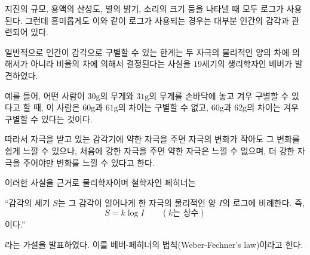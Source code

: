 \documentclass[11pt, a4paper]{book}
\begin{document}
지진의 규모, 용액의 산성도, 별의 밝기, 소리의 크기 등을 나타낼 때 모두 로그가 사용된다. 그런데 흥미롭게도 이와 같이 로그가 사용되는 경우는 대부분 인간의 감각과 관련되어 있다.

일반적으로 인간이 감각으로 구별할 수 있는 한계는 두 자극의 물리적인 양의 차에 의해서가 아니라 비율의 차에 의해서 결정된다는 사실을 $19$세기의 생리학자인 베버가 발견하였다.

예를 들어, 어떤 사람이 $30\textrm{g}$의 무게와 $31\textrm{g}$의 무게를 손바닥에 놓고 겨우 구별할 수 있다고 할 때, 이 사람은 $60\textrm{g}$과 $61\textrm{g}$의 차이는 구별할 수 없고, $60\textrm{g}$과 $62\textrm{g}$의 차이는 겨우 구별할 수 있다는 것이다.

따라서 자극을 받고 있는 감각기에 약한 자극을 주면 자극의 변화가 작아도 그 변화를 쉽게 느낄 수 있으나, 처음에 강한 자극을 주면 약한 자극은 느낄 수 없으며, 더 강한 자극을 주어야만 변화를 느낄 수 있다고 한다.

이러한 사실을 근거로 물리학자이며 철학자인 페히너는


\begin{tcolorbox}
	“감각의 세기 $S$는 그 감각이 일어나게 한 자극의 물리적인 양 $I$의 로그에 비례한다. 즉,
	\begin{equation*}
		S= k\log I \qquad (k\text{는 상수})
	\end{equation*}
	이다.”
\end{tcolorbox}

라는 가설을 발표하였다. 이를 {\color{blue}베버-페히너의 법칙(Weber-Fechner's law)}이라고 한다.
\end{document}
